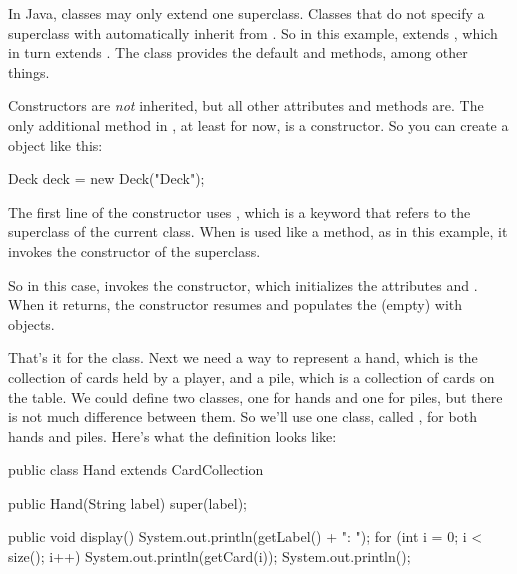 

In Java, classes may only extend one superclass.
Classes that do not specify a superclass with  automatically inherit from .
So in this example,  extends , which in turn extends .
The  class provides the default  and  methods, among other things.


Constructors are {\em not} inherited, but all other  attributes and methods are.
The only additional method in , at least for now, is a constructor.
So you can create a  object like this:

\begin{code}
Deck deck = new Deck("Deck");
\end{code}

The first line of the constructor uses , which is a keyword that refers to the superclass of the current class.
When  is used like a method, as in this example, it invokes the constructor of the superclass.


So in this case,  invokes the  constructor, which initializes the attributes  and .
When it returns, the  constructor resumes and populates the (empty)  with  objects.

That's it for the  class.
Next we need a way to represent a hand, which is the collection of cards held by a player, and a pile, which is a collection of cards on the table.
We could define two classes, one for hands and one for piles, but there is not much difference between them.
So we'll use one class, called , for both hands and piles.
Here's what the definition looks like:


\begin{code}
public class Hand extends CardCollection {

    public Hand(String label) {
        super(label);
    }

    public void display() {
        System.out.println(getLabel() + ": ");
        for (int i = 0; i < size(); i++) {
            System.out.println(getCard(i));
        }
        System.out.println();
    }
}
\end{code}

